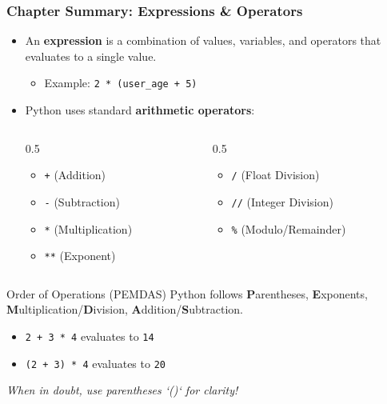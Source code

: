 \documentclass{beamer}
\begin{document}
\begin{frame}[fragile]
    \frametitle{Chapter Summary: Expressions \& Operators}
    \begin{itemize}
        \item An \textbf{expression} is a combination of values, variables, and operators that evaluates to a single value.
        \begin{itemize}
            \item Example: \texttt{2 * (user\_age + 5)}
        \end{itemize}
        \vspace{1em}
        \item Python uses standard \textbf{arithmetic operators}:
        \begin{columns}[T]
            \begin{column}{0.5\textwidth}
                \begin{itemize}
                    \item \texttt{+} (Addition)
                    \item \texttt{-} (Subtraction)
                    \item \texttt{*} (Multiplication)
                    \item \texttt{**} (Exponent)
                \end{itemize}
            \end{column}
            \begin{column}{0.5\textwidth}
                \begin{itemize}
                    \item \texttt{/} (Float Division)
                    \item \texttt{//} (Integer Division)
                    \item \texttt{\%} (Modulo/Remainder)
                \end{itemize}
            \end{column}
        \end{columns}
    \end{itemize}
    \vspace{1em}
    \begin{block}{Order of Operations (PEMDAS)}
        Python follows \textbf{P}arentheses, \textbf{E}xponents, \textbf{M}ultiplication/\textbf{D}ivision, \textbf{A}ddition/\textbf{S}ubtraction.
        \begin{itemize}
            \item \texttt{2 + 3 * 4} evaluates to \texttt{14}
            \item \texttt{(2 + 3) * 4} evaluates to \texttt{20}
        \end{itemize}
        \textit{When in doubt, use parentheses `()` for clarity!}
    \end{block}
\end{frame}
\end{document}
